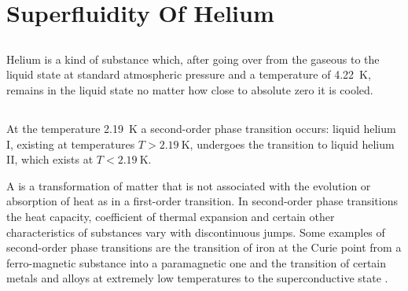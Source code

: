 \section{Superfluidity Of Helium}
\label{sec-12.4}


\subsection{}\label{12.4.1} Helium is a kind of substance which, after going over from the gaseous to the liquid state at standard atmospheric pressure and a temperature of \SI{4.22}{\kelvin}, remains in the liquid state no matter how close to absolute zero  it is cooled. 

\subsection{}\label{12.4.2} At the temperature \SI{2.19}{\kelvin} a second-order phase transi­tion occurs: liquid helium I, existing at temperatures $T > \SI{2.19}{\kelvin}$, undergoes the transition to liquid helium II, which exists at $T < \SI{2.19}{\kelvin}$.

A  is a transformation of matter that is not associated with the evolution or absorption of heat as in a first-order transition. In second-order phase transitions the heat capacity, coefficient of thermal expansion and certain other characteristics of substances vary with discontinuous jumps. Some examples of second-order phase transitions are the transition of iron at the Curie point  from a ferro­-magnetic substance into a paramagnetic one  and the transition of certain metals and alloys at extremely low tem­peratures to the superconductive state .

